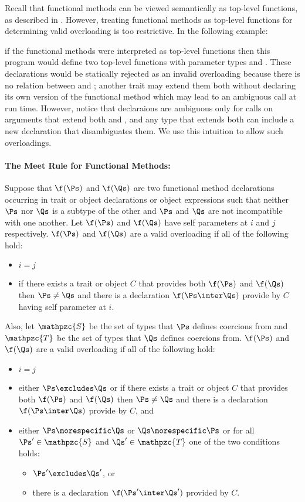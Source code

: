 Recall that functional methods can be viewed semantically as top-level
functions, as described in .  However, treating
functional methods as top-level functions for determining valid
overloading is too restrictive.  In the following example:

if the functional methods were interpreted as top-level functions then
this program would define two top-level functions with parameter types
 and .
These declarations would be
statically rejected as
an invalid overloading because there is no
relation between  and ; another trait
may extend them both without declaring its own version of the
functional method which may lead to an ambiguous call at run time.
However, notice that declaraions are ambiguous only for calls on
arguments that extend both  and , and
any type that extends both can include a new declaration that
disambiguates them.  We use this intuition to allow such overloadings.

\paragraph{The Meet Rule for Functional Methods:}
Suppose that $\f(\Ps)$ and $\f(\Qs)$ are two functional method
declarations occurring in trait or object declarations or object expressions
such that neither $\Ps$ nor $\Qs$ is a subtype of the other and $\Ps$ and $\Qs$
are not incompatible with one another.  Let $\f(\Ps)$ and $\f(\Qs)$
have self parameters at $i$ and $j$ respectively.
$\f(\Ps)$ and $\f(\Qs)$ are a valid
overloading if all of the following hold:
\begin{itemize}
\item
$i = j$
\item if there exists a trait or object $C$
that provides both $\f(\Ps)$ and $\f(\Qs)$ then $\Ps \neq \Qs$ and
there is a declaration $\f(\Ps \inter \Qs)$ provide by $C$
having self parameter at $i$.
\end{itemize}

Also, let $\mathpzc{S}$ be the set of types that $\Ps$
defines coercions from and $\mathpzc{T}$ be the set of types that
$\Qs$ defines coercions from.  $\f(\Ps)$ and $\f(\Qs)$ are a valid
overloading if all of the following hold:
\begin{itemize}
\item
$i = j$
\item
either $\Ps \excludes \Qs$ or if there exists a trait or object $C$
that provides both $\f(\Ps)$ and $\f(\Qs)$ then $\Ps \neq \Qs$ and
there is a declaration $\f(\Ps \inter \Qs)$ provide by $C$, and
\item
either $\Ps \morespecific \Qs$ or $\Qs \morespecific \Ps$ or
for all $\Ps' \in \mathpzc{S}$ and
$\Qs' \in \mathpzc{T}$ one of the two conditions holds:
\begin{itemize}
\item
$\Ps' \excludes \Qs'$, or
\item
there is a declaration $\f(\Ps' \inter \Qs')$ provided by $C$.
\end{itemize}
\end{itemize}

